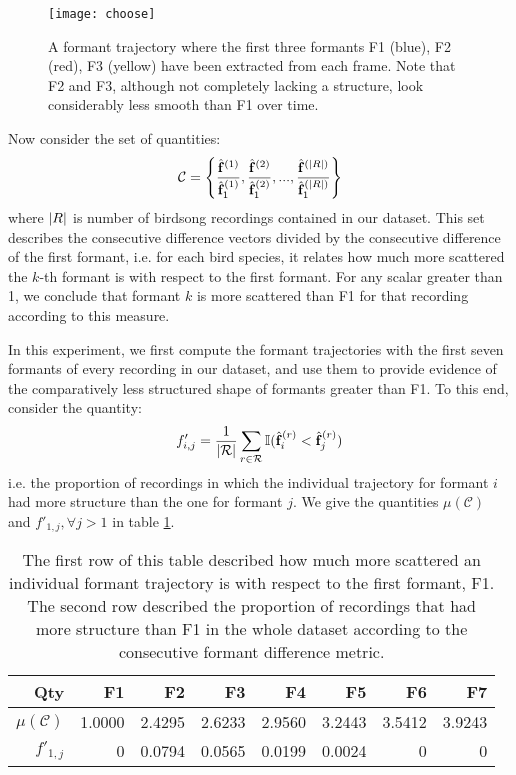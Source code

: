 \documentclass[../main.tex]{subfiles}
\begin{document}
\begin{figure}[ht]
\centering
\texttt{[image: choose]}
\caption{A formant trajectory where the first three formants F1 (blue), F2 (red), F3 (yellow) have been extracted from each frame. Note that F2 and F3, although not completely lacking a structure, look considerably less smooth than F1 over time.}
\label{fig_choose}
\end{figure}
\par Now consider the set of quantities:
\begin{align*}
\mathcal{C} = \left\{\frac{\hat{\mathbf{f}}^{(1)}}{\hat{\mathbf{f}}^{(1)}_1}, \frac{\hat{\mathbf{f}}^{(2)}}{\hat{\mathbf{f}}^{(2)}_1}, ..., \frac{\hat{\mathbf{f}}^{(\lvert R\rvert)}}{\hat{\mathbf{f}}^{(\lvert R\rvert)}_1}\right\}
\end{align*}
where $\lvert R\rvert$ is number of birdsong recordings contained in our dataset. This set describes the consecutive difference vectors divided by the consecutive difference of the first formant, i.e. for each bird species, it relates how much more scattered the $k$-th formant is with respect to the first formant. For any scalar greater than 1, we conclude that formant $k$ is more scattered than F1 for that recording according to this measure. 
\par In this experiment, we first compute the formant trajectories with the first seven formants of every recording in our dataset, and use them to provide evidence of the comparatively less structured shape of formants greater than F1. To this end, consider the quantity:
\begin{align*}
f'_{i, j} = \frac{1}{\lvert\mathcal{R}\rvert}\sum_{r \in \mathcal{R}} \mathbb{I}(\hat{\mathbf{f}}^{(r)}_i < \hat{\mathbf{f}}^{(r)}_j)
\end{align*}
i.e. the proportion of recordings in which the individual trajectory for formant $i$ had more structure than the one for formant $j$. We give the quantities $\mu(\mathcal{C})$ and $f'_{1, j}, \forall j > 1$ in table  \ref{table_choose}.
\begin{table}[ht]
\centering
\begin{tabular}{r|r|r|r|r|r|r|r} 
 \textbf{Qty} &\textbf{F1} &  \textbf{F2}&  \textbf{F3}&  \textbf{F4}&  \textbf{F5}&  \textbf{F6}&  \textbf{F7}\\
 \hline
 $\mu(\mathcal{C})$ & 1.0000  &  2.4295  &  2.6233  &  2.9560  &  3.2443  &  3.5412  &  3.9243 \\
 $f'_{1, j}$ & 0 & 0.0794 & 0.0565 & 0.0199 & 0.0024 & 0 & 0
\end{tabular}
\caption{The first row of this table described how much more scattered an individual formant trajectory is with respect to the first formant, F1. The second row described the proportion of recordings that had more structure than F1 in the whole dataset according to the consecutive formant difference metric.}\label{table_choose}
\end{table}
\end{document}
